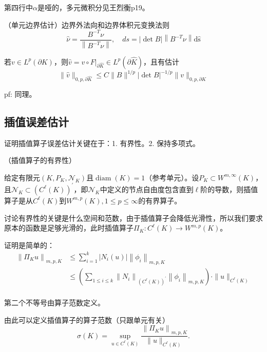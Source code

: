 第四行中$\alpha$是哑的，多元微积分见王烈衡p19。

\begin{lem}
  （单元边界估计）边界外法向和边界体积元变换法则
  \[
    \widehat{\nu}=\frac{B^{-T} \nu}{\left\|B^{-T} \nu\right\|}, \quad ds=|\operatorname{det} B|\left\|B^{-T} \nu\right\| \mathrm{d} \widehat{\mathrm{s}}
  \]

  若$v \in L^{p}(\partial K)$，则$\widehat{v}=\left.v \circ F\right|_{\partial \widehat{K}} \in L^{p}(\partial \widehat{K})$，且有估计
  \[
    \|\widehat{v}\|_{0, p, \partial \widehat{K}} \le C\|B\|^{1 / p}|\operatorname{det} B|^{-1 / p}\|v\|_{0, p, \partial K}
  \]
\end{lem}

pf: 同理。

\subsection{插值误差估计}

证明插值算子误差估计关键在于：1. 有界性。2. 保持多项式。

\begin{lem}
  （插值算子的有界性）

  给定有限元$\left(K, P_{K}, \mathcal{N}_{K}\right)$且$\operatorname{diam}(K)=1$（参考单元）。设$P_{K} \subset W^{m, \infty}(K)$，且$\mathcal{N}_{K} \subset\left(C^{\ell}(K)\right)^{\prime}$，即$\mathcal{N}_{K}$中定义的节点自由度包含直到$\ell$阶的导数，则插值算子是从$C^{\ell}(K)$到$W^{m, p}(K), 1 \le p \le \infty$的有界算子。
\end{lem}

讨论有界性的关键是什么空间和范数，由于插值算子会降低光滑性，所以我们要求原本的函数是足够光滑的，此时插值算子$\Pi_K: C^{\ell}(K) \to W^{m, p}(K)$。

\begin{pf}
  证明是简单的：
  \[
    \begin{aligned}
      \left\|\Pi_{K} u\right\|_{m, p, K} & \le \sum_{i=1}^{k}\left|N_{i}(u)\right|\left\|\phi_{i}\right\|_{m, p, K} \\
      & \le\left(\sum_{1 \le i \le k}\left\|N_{i}\right\|_{\left(C^{\ell}(K)\right)^{\prime}}\left\|\phi_{i}\right\|_{m, p, K}\right) \cdot\|u\|_{C^{\ell}(K)} \\
    \end{aligned}
  \]
  
  第二个不等号由算子范数定义。
\end{pf}

由此可以定义插值算子的算子范数（只跟单元有关）
\[
  \sigma(K)=\sup _{u \in C^{\ell}(K)} \frac{\left\|\Pi_{K} u\right\|_{m, p, K}}{\|u\|_{C^{\ell}(K)}}.
\]

